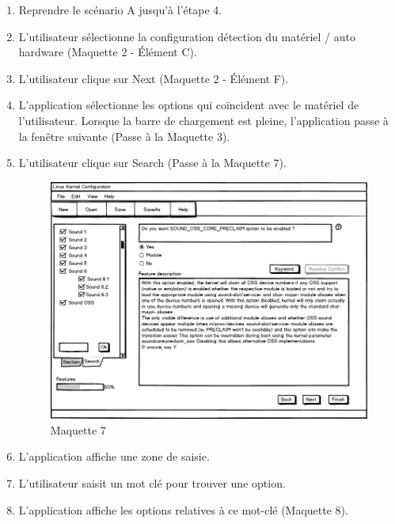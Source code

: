 \documentclass[16pts]{report}
\begin{document}
\begin{enumerate}
    \item Reprendre le scénario A jusqu’à l’étape 4.
    \item L’utilisateur sélectionne la configuration détection du matériel /
        auto hardware (Maquette 2 - Élément C).
    \item L’utilisateur clique sur Next (Maquette 2 - Élément F).
    \item L’application sélectionne les options qui coïncident avec le matériel
        de l’utilisateur. Lorsque la barre de chargement est pleine,
        l’application passe à la fenêtre suivante (Passe à la Maquette 3).
    \item L’utilisateur clique sur Search (Passe à la Maquette 7).
    \begin{figure}[H]
        \includegraphics[scale=0.5]{illustrations/maquettes/Maquette_7_MainWindowSearch.png}
        \centering
        \caption{Maquette 7}
        \label{fig:Maq7}
    \end{figure}
    \item L’application affiche une zone de saisie.
    \item L’utilisateur saisit un mot clé pour trouver une option.
    \item L’application affiche les options relatives à ce mot-clé (Maquette 8).
    \begin{figure}[H]

\end{figure}
\end{enumerate}
\end{document}
